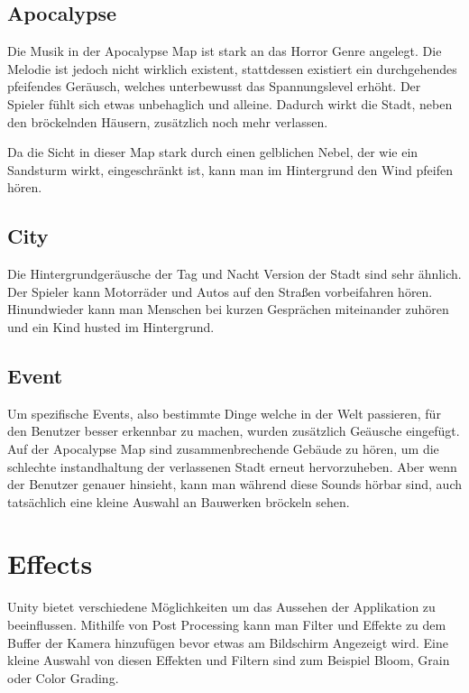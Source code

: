 \subsection{Apocalypse}\label{subsec:apocalypse-background-sound}
Die Musik in der Apocalypse Map ist stark an das Horror Genre angelegt.
Die Melodie ist jedoch nicht wirklich existent, stattdessen existiert ein durchgehendes pfeifendes Ger\"ausch, welches unterbewusst das Spannungslevel erh\"oht.
Der Spieler f\"uhlt sich etwas unbehaglich und alleine.
Dadurch wirkt die Stadt, neben den br\"ockelnden H\"ausern, zus\"atzlich noch mehr verlassen.

Da die Sicht in dieser Map stark durch einen gelblichen Nebel, der wie ein Sandsturm wirkt, eingeschr\"ankt ist, kann man im Hintergrund den Wind pfeifen h\"oren.

\subsection{City}\label{subsec:day-night-background-sound}
Die Hintergrundger\"ausche der Tag und Nacht Version der Stadt sind sehr \"ahnlich.
Der Spieler kann Motorr\"ader und Autos auf den Straßen vorbeifahren h\"oren.
Hinundwieder kann man Menschen bei kurzen Gespr\"achen miteinander zuh\"oren und ein Kind husted im Hintergrund.

\subsection{Event}\label{subsec:building-collapse-sound}
Um spezifische Events, also bestimmte Dinge welche in der Welt passieren, f\"ur den Benutzer besser erkennbar zu machen, wurden zus\"atzlich Ge\"ausche eingef\"ugt.
Auf der Apocalypse Map sind zusammenbrechende Geb\"aude zu h\"oren, um die schlechte instandhaltung der verlassenen Stadt erneut hervorzuheben.
Aber wenn der Benutzer genauer hinsieht, kann man w\"ahrend diese Sounds h\"orbar sind, auch tats\"achlich eine kleine Auswahl an Bauwerken br\"ockeln sehen.

\section{Effects}\label{sec:effects}
Unity bietet verschiedene M\"oglichkeiten um das Aussehen der Applikation zu beeinflussen.
Mithilfe von Post Processing kann man Filter und Effekte zu dem Buffer der Kamera hinzuf\"ugen bevor etwas am Bildschirm Angezeigt wird.
Eine kleine Auswahl von diesen Effekten und Filtern sind zum Beispiel Bloom, Grain oder Color Grading.
~\cite{Unity_Post_Processing_2022}

